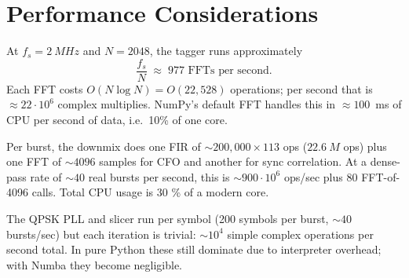 \documentclass[11pt,a4paper]{article}
\begin{document}
\begin{center}
\end{center}

\section{Performance Considerations}

At $f_s = \SI{2}{MHz}$ and $N = 2048$, the tagger runs approximately
\begin{equation}
\frac{f_s}{N} \;\approx\; 977 \text{ FFTs per second}.
\end{equation}
Each FFT costs $O(N \log N) = O(22{,}528)$ operations; per second that is
$\approx 22 \cdot 10^6$ complex multiplies. NumPy's default FFT handles
this in $\approx 100$~ms of CPU per second of data, i.e.\ 10\% of one core.

Per burst, the downmix does one FIR of $\sim 200{,}000 \times 113$ ops
($\SI{22.6}{M}$ ops) plus one FFT of $\sim 4096$ samples for CFO and
another for sync correlation. At a dense-pass rate of $\sim 40$ real
bursts per second, this is $\sim 900 \cdot 10^6$ ops/sec plus $80$
FFT-of-4096 calls. Total CPU usage is 30 \% of a modern
core.

The QPSK PLL and slicer run per symbol (200 symbols per
burst, $\sim 40$ bursts/sec) but each iteration is trivial:
$\sim 10^4$ simple complex operations per second total. In pure Python
these still dominate due to interpreter overhead; with Numba they
become negligible.
\end{document}
